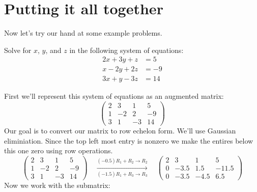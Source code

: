 \documentclass{ximera}
\begin{document}
\section{Putting it all together}

Now let's try our hand at some example problems.


\begin{example}
  Solve for $x$, $y$, and $z$ in the following system of equations:
  \begin{align*}
    2x + 3y + z  &= 5 \\
    x -2y+ 2z &=-9\\
    3x +y- 3z &=14
  \end{align*}

\begin{explanation}
First we'll represent this system of equations as an augmented matrix:
\[
  \left(
    \begin{array}{ccc|c}
      2 & 3 & 1 & 5 \\
      1 &  -2 & 2 &-9 \\
      3 &  1 & -3 & 14
    \end{array}
  \right)
\]
Our goal is to convert our matrix to row echelon form. We'll use
Gaussian eliminiation. Since the top left most entry is nonzero we
make the entires below this one zero using row operations.
\[
  \begin{pmatrix}
    2 & 3 & 1 & 5 \\
    1 &  -2 & 2 &-9 \\
    3 &  1 & -3 & 14
  \end{pmatrix}
  \quad\xrightarrow[(-1.5) R_1 + R_3 \to R_3]{(-0.5) R_1 + R_2 \to R_2}\quad
  \begin{pmatrix}
    2 & 3 & 1 & 5 \\
    0 & -3.5 & 1.5 &-11.5 \\
    0 & -3.5 & -4.5 & 6.5
  \end{pmatrix}
\]
Now we work with the submatrix:
\begin{center}
\end{center}
\end{explanation}
\end{example}
\end{document}

